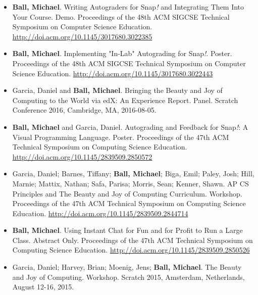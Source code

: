 \begin{itemize}
    \item{\textbf{Ball, Michael}. Writing Autograders for Snap\textit{!} and Integrating Them Into Your Course. Demo. Proceedings of the 48th ACM SIGCSE Technical Symposium on Computer Science Education.} \href{http://doi.acm.org/10.1145/3017680.3022385}{http://doi.acm.org/10.1145/3017680.3022385}

    \item{\textbf{Ball, Michael}. Implementing "In-Lab" Autograding for Snap\textit{!}. Poster. Proceedings of the 48th ACM SIGCSE Technical Symposium on Computer Science Education.} \newline\href{http://doi.acm.org/10.1145/3017680.3022443}{http://doi.acm.org/10.1145/3017680.3022443}
    

    \item{Garcia, Daniel and \textbf{Ball, Michael}. Bringing the Beauty and Joy of Computing to the World via edX: An Experience Report. Panel. Scratch Conference 2016, Cambridge, MA, 2016-08-05.}

    \item{\textbf{Ball, Michael} and Garcia, Daniel. Autograding and Feedback for Snap\textit{!}: A Visual Programming Language. Poster. Proceedings of the 47th ACM Technical Symposium on Computing Science Education.}
    \href{http://doi.acm.org/10.1145/2839509.2850572}{http://doi.acm.org/10.1145/2839509.2850572}

    \item{Garcia, Daniel; Barnes, Tiffany; \textbf{Ball, Michael}; Biga, Emil; Paley, Josh; Hill, Marnie; Mattix, Nathan; Safa, Parisa; Morris, Sean; Kenner, Shawn. AP CS Principles and The Beauty and Joy of Computing Curriculum. Workshop. Proceedings of the 47th ACM Technical Symposium on Computing Science Education.} \href{http://doi.acm.org/10.1145/2839509.2844714}{http://doi.acm.org/10.1145/2839509.2844714}

    \item{\textbf{Ball, Michael}. Using Instant Chat for Fun and for Profit to Run a Large Class. Abstract Only. Proceedings of the 47th ACM Technical Symposium on Computing Science Education.} \href{http://doi.acm.org/10.1145/2839509.2850526}{http://doi.acm.org/10.1145/2839509.2850526}
    

    \item{Garcia, Daniel; Harvey, Brian; Moenig, Jens; \textbf{Ball, Michael}. The Beauty and Joy of Computing. Workshop. Scratch 2015, Amsterdam, Netherlands, August 12-16, 2015.}


\end{itemize}
